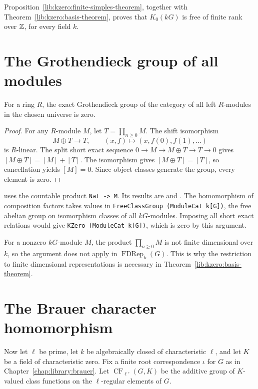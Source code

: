 Proposition~\ref{lib:kzero:finite-simples-theorem}, together with
Theorem~\ref{lib:kzero:basis-theorem}, proves that $K_0(kG)$ is free
of finite rank over $\mathbb Z$, for every field $k$.

\section{The Grothendieck group of all modules}
\label{lib:kzero:swindle}

\begin{proposition}
\label{lib:kzero:swindle-theorem}
For a ring $R$, the exact Grothendieck group of the category of all left
$R$-modules in the chosen universe is zero.
\end{proposition}
\begin{proof}
For any $R$-module $M$, let $T=\prod_{n\geq0}M$. The shift isomorphism
\[
 M\oplus T\longrightarrow T,
 \qquad (x,f)\longmapsto(x,f(0),f(1),\ldots)
\]
is $R$-linear. The split short exact sequence
$0\to M\to M\oplus T\to T\to0$ gives $[M\oplus T]=[M]+[T]$.
The isomorphism gives $[M\oplus T]=[T]$, so cancellation yields $[M]=0$.
Since object classes generate the group, every element is zero.
\end{proof}

\begin{implementation}
 uses the countable product
{\small\texttt{Nat -> M}}. Its results are  and
. The homomorphism of composition factors
 takes values in
{\small\texttt{FreeClassGroup (ModuleCat k[G])}}, the free abelian group on
isomorphism classes of all $kG$-modules. Imposing all short exact relations would give
{\small\texttt{KZero (ModuleCat k[G])}}, which is zero by this argument.
\end{implementation}

For a nonzero $kG$-module $M$, the product $\prod_{n\geq0}M$ is not finite
dimensional over $k$, so the argument does not apply in
$\operatorname{FDRep}_k(G)$.
This is why the restriction to finite dimensional representations is
necessary in Theorem~\ref{lib:kzero:basis-theorem}.

\section{The Brauer character homomorphism}
\label{lib:kzero:characters}

Now let $\ell$ be prime, let $k$ be algebraically closed of characteristic
$\ell$, and let $K$ be a field of characteristic zero. Fix a finite root
correspondence $\iota$ for $G$ as in Chapter~\ref{chap:library:brauer}.
Let $\operatorname{CF}_{\ell'}(G,K)$ be the additive group of $K$-valued
class functions on the $\ell$-regular elements of $G$.

